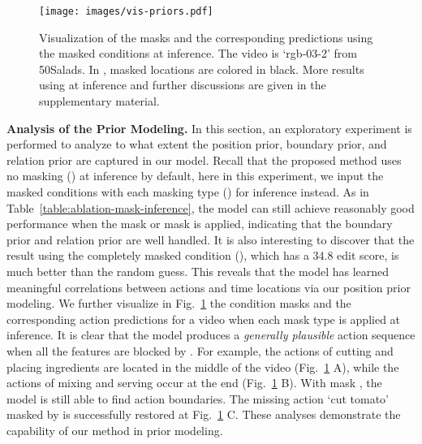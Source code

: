 \documentclass[10pt,twocolumn,letterpaper]{article}
\begin{document}
\begin{figure}[t]
\begin{center}
   \texttt{[image: images/vis-priors.pdf]}
\end{center}
   \caption{Visualization of the masks and the corresponding predictions using the masked conditions at inference. The video is `rgb-03-2' from 50Salads. In , masked locations are colored in black. More results using  at inference and further discussions are given in the supplementary material.}
\label{fig:vis-priors}
\end{figure}


\textbf{Analysis of the Prior Modeling.}
In this section, an exploratory experiment is performed to analyze to what extent the position
prior, boundary prior, and relation prior are captured in our model.
Recall that the proposed method uses no masking () at inference by default, here in this experiment, we input the masked conditions with each masking type () for inference instead.
As in Table~\ref{table:ablation-mask-inference}, the model can still achieve reasonably good performance when the mask  or mask  is applied, indicating that the boundary prior and relation prior are well handled.
It is also interesting to discover that the result using the completely masked condition (), which has a 34.8 edit score, is much better than the random guess.
This reveals that the model has learned meaningful correlations between actions and time locations via our position prior modeling.
We further visualize in Fig.~\ref{fig:vis-priors} the condition masks and the corresponding action predictions for a video when each mask type is applied at inference. 
It is clear that the model produces a \textit{generally plausible} action sequence when all the features are blocked by .
For example, the actions of cutting and placing ingredients are located in the middle of the video (Fig.~\ref{fig:vis-priors} A), while the actions of mixing and serving occur at the end (Fig.~\ref{fig:vis-priors} B).
With mask , the model is still able to find action boundaries.
The missing action `cut tomato' masked by  is successfully restored at Fig.~\ref{fig:vis-priors} C.
These analyses demonstrate the capability of our method in prior modeling.
\end{document}
